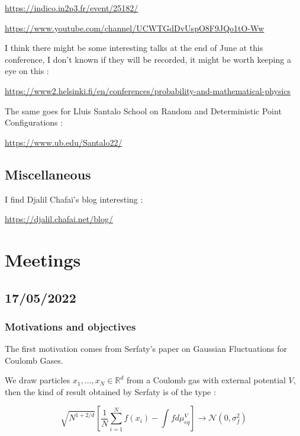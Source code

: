 \documentclass[a4paper,12pt]{report}
\begin{document}
\href{https://indico.in2p3.fr/event/25182/}{https://indico.in2p3.fr/event/25182/}

\href{https://www.youtube.com/channel/UCWTGdDvUspO8F9JQo1tO-Ww}{https://www.youtube.com/channel/UCWTGdDvUspO8F9JQo1tO-Ww}
\vspace{0.5cm}

I think there might be some interesting talks at the end of June at this conference, I don't known if they will be recorded, it might be worth keeping a eye on this :

\href{https://www2.helsinki.fi/en/conferences/probability-and-mathematical-physics}{https://www2.helsinki.fi/en/conferences/probability-and-mathematical-physics}
\vspace{0.5cm}

The same goes for Lluis Santalo School on Random and Deterministic Point Configurations :

\href{https://www.ub.edu/Santalo22/}{https://www.ub.edu/Santalo22/}

\section{Miscellaneous}

I find Djalil Chafaï's blog interesting :

\href{https://djalil.chafai.net/blog/}{https://djalil.chafai.net/blog/}


\chapter{Meetings}

\section{17/05/2022}\label{meet:1705}

\subsection*{Motivations and objectives}

The first motivation comes from Serfaty's paper \cite{serfaty2020} on Gaussian Fluctuations for Coulomb Gases.

We draw particles $x_1, ..., x_N \in \mathbb{R}^{d}$ from a Coulomb gas with external potential $V$, then the kind of result obtained by Serfaty is of the type : 

\[\sqrt{N^{1+2/d} }\left[\frac{1}{N}\sum\limits_{i=1}^{N} f(x_i) - \int f d\mu_{eq}^{V}\right] \longrightarrow \mathcal{N}\left(0, \sigma_{f}^{2}\right)\]
\end{document}
